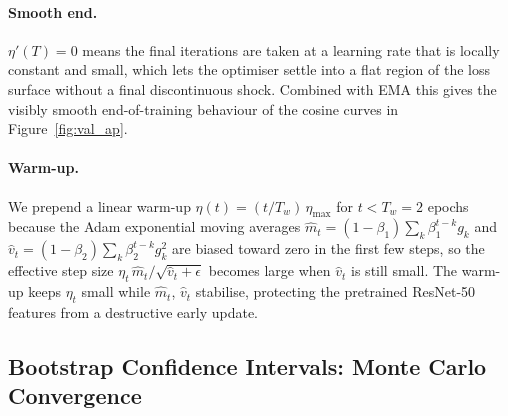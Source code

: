 \documentclass[11pt,a4paper]{article}
\begin{document}
\paragraph{Smooth end.} $\eta'(T) = 0$ means the final iterations are taken at a learning rate that is locally constant and small, which lets the optimiser settle into a flat region of the loss surface without a final discontinuous shock. Combined with EMA this gives the visibly smooth end-of-training behaviour of the cosine curves in Figure~\ref{fig:val_ap}.

\paragraph{Warm-up.} We prepend a linear warm-up $\eta(t) = (t / T_w)\,\eta_{\max}$ for $t < T_w = 2$ epochs because the Adam exponential moving averages $\hat m_t = (1-\beta_1)\sum_k \beta_1^{t-k} g_k$ and $\hat v_t = (1-\beta_2)\sum_k \beta_2^{t-k} g_k^2$ are biased toward zero in the first few steps, so the effective step size $\eta_t\,\hat m_t / \sqrt{\hat v_t + \epsilon}$ becomes large when $\hat v_t$ is still small. The warm-up keeps $\eta_t$ small while $\hat m_t$, $\hat v_t$ stabilise, protecting the pretrained ResNet-50 features from a destructive early update.

\subsection{Bootstrap Confidence Intervals: Monte Carlo Convergence}
\label{sec:numerical-bootstrap}
\end{document}
